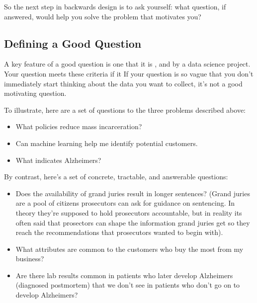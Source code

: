 \documentclass[letterpaper,10pt,english]{jupyterBook}
\begin{document}
\sphinxAtStartPar
So the next step in backwards design is to ask yourself: what question, if answered, would help you solve the problem that motivates you?


\subsection{Defining a Good Question}
\label{\detokenize{40_in_practice/05_backwards_design:defining-a-good-question}}
\sphinxAtStartPar
A key feature of a good question is one that it is ,  and  by a data science project. Your question meets these criteria if it  If your question is so vague that you don’t immediately start thinking about the data you want to collect, it’s not a good motivating question.

\sphinxAtStartPar
To illustrate, here are a set of  questions to the three problems described above:
\begin{itemize}
\item {} 
\sphinxAtStartPar
What policies reduce mass incarceration?

\item {} 
\sphinxAtStartPar
Can machine learning help me identify potential customers.

\item {} 
\sphinxAtStartPar
What indicates Alzheimers?

\end{itemize}

\sphinxAtStartPar
By contrast, here’s a set of concrete, tractable, and answerable questions:
\begin{itemize}
\item {} 
\sphinxAtStartPar
Does the availability of grand juries result in longer sentences? (Grand juries are a pool of citizens prosecutors can ask for guidance on sentencing. In theory they’re supposed to hold prosecutors accountable, but in reality its often said that prosectors can shape the information grand juries get so they reach the recommendations that prosecutors wanted to begin with).

\item {} 
\sphinxAtStartPar
What attributes are common to the customers who buy the most from my business?

\item {} 
\sphinxAtStartPar
Are there lab results common in patients who later develop Alzheimers (diagnosed post\sphinxhyphen{}mortem) that we don’t see in patients who don’t go on to develop Alzheimers?

\end{itemize}
\end{document}
